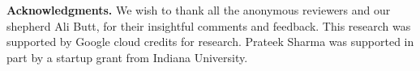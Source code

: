 

\noindent \textbf{Acknowledgments.} We wish to thank all the anonymous reviewers and our shepherd Ali Butt, for  their insightful comments and feedback.
This research was supported by Google cloud credits for research. 
Prateek Sharma was supported in part by a startup grant from Indiana University. 




